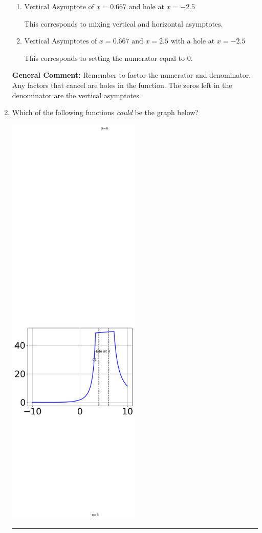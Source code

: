 \documentclass{extbook}[14pt]
\newcommand{\litem}[1]{\item #1

\rule{\textwidth}{0.4pt}}
\begin{document}
\begin{enumerate}
{\begin{enumerate}[label=\Alph*.]
This corresponds to not factoring out the hole.
\item \( \text{Vertical Asymptote of } x = 0.667 \text{ and hole at } x = -2.5 \)

This corresponds to mixing vertical and horizontal asymptotes.
\item \( \text{Vertical Asymptotes of } x = 0.667 \text{ and } x = 2.5 \text{ with a hole at } x = -2.5 \)

This corresponds to setting the numerator equal to 0.
\end{enumerate}

\textbf{General Comment:} Remember to factor the numerator and denominator. Any factors that cancel are holes in the function. The zeros left in the denominator are the vertical asymptotes.
}
\litem{
Which of the following functions \textit{could} be the graph below?

\begin{center}
    \includegraphics[width=0.5\textwidth]{../Figures/identifyGraphOfRationalFunctionCopyC.png}
\end{center}


}
\end{enumerate}
\end{document}
